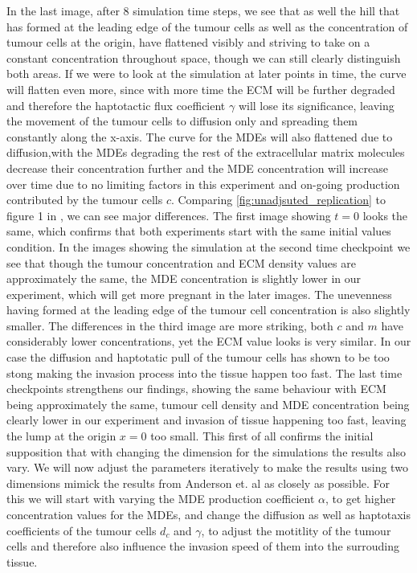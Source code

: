 In the last image, after 8 simulation time steps, we see that as well the hill that has formed at the leading edge of the tumour cells as well as the concentration of tumour cells at the origin, have flattened visibly and striving to take on a constant concentration throughout space, though we can still clearly distinguish both areas. If we were to look at the simulation at later points in time, the curve will flatten even more, since with more time the ECM will be further degraded and therefore the haptotactic flux coefficient $\gamma$ will lose its significance, leaving the movement of the tumour cells to diffusion only and spreading them constantly along the x-axis. The curve for the MDEs will also flattened due to diffusion,with the MDEs degrading the rest of the extracellular matrix molecules decrease their concentration further and the MDE concentration will increase over time due to no limiting factors in this experiment and on-going production contributed by the tumour cells $c$.\newline
Comparing \ref{fig:unadjsuted_replication} to figure 1 in \cite{anderson_mathematical_2000}, we can see major differences. The first image showing $t=0$ looks the same, which confirms that both experiments start with the same initial values condition. In the images showing the simulation at the second time checkpoint we see that though the tumour concentration and ECM density values are approximately the same, the MDE concentration is slightly lower in our experiment, which will get more pregnant in the later images. The unevenness having formed at the leading edge of the tumour cell concentration is also slightly smaller. The differences in the third image are more striking, both $c$ and $m$ have considerably lower concentrations, yet the ECM value looks is very similar. \newline 
In our case the diffusion and haptotatic pull of the tumour cells has shown to be too stong making the invasion process into the tissue happen too fast. The last time checkpoints strengthens our findings, showing the same behaviour with ECM being approximately the same, tumour cell density and MDE concentration being clearly lower in our experiment and invasion of tissue happening too fast, leaving the lump at the origin $x=0$ too small. \newline 
This first of all confirms the initial supposition that with changing the dimension for the simulations the results also vary. We will now adjust the parameters iteratively to make the results using two dimensions mimick the results from Anderson et. al as closely as possible. For this we will start with varying the MDE production coefficient $\alpha$, to get higher concentration values for the MDEs, and change the diffusion as well as haptotaxis coefficients of the tumour cells $d_c$ and  $\gamma$, to adjust the motitlity of the tumour cells and therefore also influence the invasion speed of them into the surrouding tissue.


